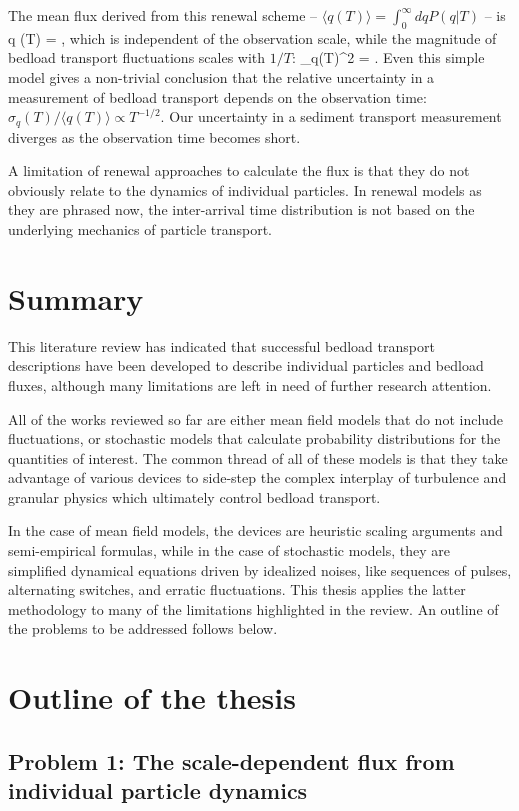 The mean flux derived from this renewal scheme -- $\langle q (T)\rangle = \int_0^\infty dq P(q|T)$ -- is
\be \langle q (T) \rangle = \Lambda, \ee
which is independent of the observation scale, while the magnitude of bedload transport fluctuations scales with $1/T$: 
\be \sigma_q(T)^2 = .\ee
Even this simple model gives a non-trivial conclusion that the relative uncertainty in a measurement of bedload transport depends on the observation time: $\sigma_q(T)/\langle q(T) \rangle \propto T^{-1/2}.$ Our uncertainty in a sediment transport measurement diverges as the observation time becomes short.

A limitation of renewal approaches to calculate the flux is that they do not obviously relate to the dynamics of individual particles. In renewal models as they are phrased now, the inter-arrival time distribution is not based on the underlying mechanics of particle transport.

\section{Summary}

This literature review has indicated that successful bedload transport descriptions have been developed to describe individual particles and bedload fluxes, although many limitations are left in need of further research attention.

All of the works reviewed so far are either mean field models that do not include fluctuations, or stochastic models that calculate probability distributions for the quantities of interest.
The common thread of all of these models is that they take advantage of various devices to side-step the complex interplay of turbulence and granular physics which ultimately control bedload transport.

In the case of mean field models, the devices are heuristic scaling arguments and semi-empirical formulas, while in the case of stochastic models, they are simplified dynamical equations driven by idealized noises, like sequences of pulses, alternating switches, and erratic fluctuations.
This thesis applies the latter methodology to many of the limitations highlighted in the review. An outline of the problems to be addressed follows below.

\section{Outline of the thesis}
\subsection{Problem 1: The scale-dependent flux from individual particle dynamics}

